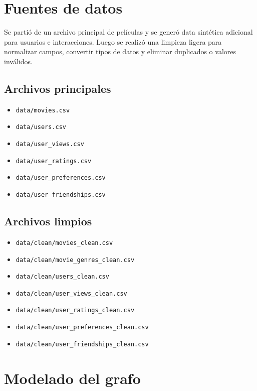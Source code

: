\documentclass[12pt,a4paper]{article}
\begin{document}
\section{Fuentes de datos}

Se partió de un archivo principal de películas y se generó data sintética adicional para usuarios e interacciones. Luego se realizó una limpieza ligera para normalizar campos, convertir tipos de datos y eliminar duplicados o valores inválidos.

\subsection{Archivos principales}

\begin{itemize}
    \item \texttt{data/movies.csv}
    \item \texttt{data/users.csv}
    \item \texttt{data/user\_views.csv}
    \item \texttt{data/user\_ratings.csv}
    \item \texttt{data/user\_preferences.csv}
    \item \texttt{data/user\_friendships.csv}
\end{itemize}

\subsection{Archivos limpios}

\begin{itemize}
    \item \texttt{data/clean/movies\_clean.csv}
    \item \texttt{data/clean/movie\_genres\_clean.csv}
    \item \texttt{data/clean/users\_clean.csv}
    \item \texttt{data/clean/user\_views\_clean.csv}
    \item \texttt{data/clean/user\_ratings\_clean.csv}
    \item \texttt{data/clean/user\_preferences\_clean.csv}
    \item \texttt{data/clean/user\_friendships\_clean.csv}
\end{itemize}

\section{Modelado del grafo}
\end{document}
